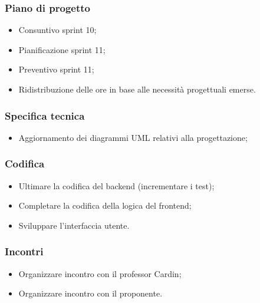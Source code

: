 \subsubsection{Piano di progetto}
\begin{itemize}
    \item Consuntivo sprint 10;
    \item Pianificazione sprint 11;
    \item Preventivo sprint 11;
    \item Ridistribuzione delle ore in base alle necessità progettuali emerse.
\end{itemize}

\subsubsection{Specifica tecnica}
\begin{itemize}
    \item Aggiornamento dei diagrammi UML relativi alla progettazione;
\end{itemize}

\subsubsection{Codifica}
\begin{itemize}
    \item Ultimare la codifica del backend (incrementare i test);
    \item Completare la codifica della logica del frontend;
    \item Sviluppare l'interfaccia utente.
\end{itemize}

\subsubsection{Incontri}
\begin{itemize}
    \item Organizzare incontro con il professor Cardin;
    \item Organizzare incontro con il proponente.
\end{itemize}
